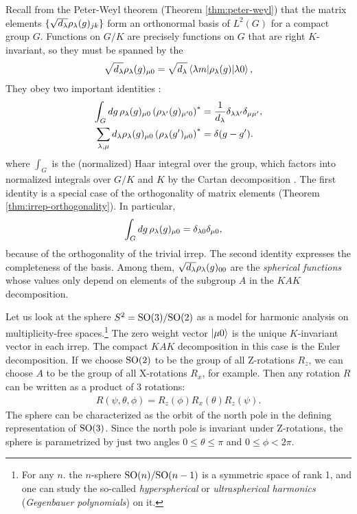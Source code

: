Recall from the Peter-Weyl theorem (Theorem \ref{thm:peter-weyl}) that the matrix elements $\{ \sqrt{d_{\lambda}} \\ \rho_{\lambda}(g)_{jk} \}$ form an orthonormal basis of $L^2(G)$ for a compact group $G$. Functions on $G/K$ are precisely functions on $G$ that are right $K$-invariant, so they must be spanned by the
\begin{align}
\sqrt{d_{\lambda}} \rho_{\lambda}(g)_{\mu 0} = \sqrt{d_{\lambda}} \braket{\lambda m|\rho_{\lambda}(g)|\lambda 0},
\end{align}
They obey two important identities \cite[p. 423]{Barut}:
\begin{align}
	\int_G dg\, \rep_{\lambda}(g)_{\mu 0} \left( \rep_{\lambda'}(g)_{\mu' 0} \right)^* &= \frac{1}{d_{\lambda}} \delta_{\lambda\lambda'} \delta_{\mu\mu'}, \\
	\sum_{\lambda,\mu} d_{\lambda} \rep_{\lambda}(g)_{\mu 0} \left( \rep_{\lambda}(g')_{\mu 0} \right)^* &= \delta (g - g'). \label{thm:completeness}
\end{align}
where $\int_G$ is the (normalized) Haar integral over the group, which factors into normalized integrals over $G/K$ and $K$ by the Cartan decomposition \cite{Vilenkin1}. The first identity is a special case of the orthogonality of matrix elements (Theorem \ref{thm:irrep-orthogonality}). In particular,
\begin{align}
\int_G dg\, \rho_{\lambda}(g)_{\mu 0} &= \delta_{\lambda 0} \delta_{\mu 0},
\end{align}
because of the orthogonality of the trivial irrep. The second identity expresses the completeness of the basis. Among them, $\sqrt{d_{\lambda}} \rho_{\lambda}(g)_{00}$ are the \emph{spherical functions} whose values only depend on elements of the subgroup $A$ in the $KAK$ decomposition.

Let us look at the sphere $S^2 = \text{SO}(3)/\text{SO}(2)$ as a model for harmonic analysis on multiplicity-free spaces.\footnote{For any $n$. the $n$-sphere $\text{SO}(n)/\text{SO}(n-1)$ is a symmetric space of rank 1, and one can study the so-called \emph{hyperspherical} or \emph{ultraspherical harmonics} (\emph{Gegenbauer polynomials}) on it.} The zero weight vector ${\left\vert{\mu 0}\right\rangle}$ is the unique $K$-invariant vector in each irrep. The compact $KAK$ decomposition in this case is the Euler decomposition.  If we choose $\text{SO}(2)$ to be the group of all Z-rotations $R_z$, we can choose $A$ to be the group of all X-rotations $R_x$, for example. Then any rotation $R$ can be written as a product of 3 rotations:
\begin{align}
R(\psi,\theta,\phi) = R_z(\phi) R_x (\theta) R_z (\psi).
\end{align}
The sphere can be characterized as the orbit of the north pole in the defining representation of $\text{SO}(3)$. Since the north pole is invariant under Z-rotations, the sphere is parametrized by just two angles $0 \le \theta \le \pi$ and $0\le \phi < 2\pi$.

